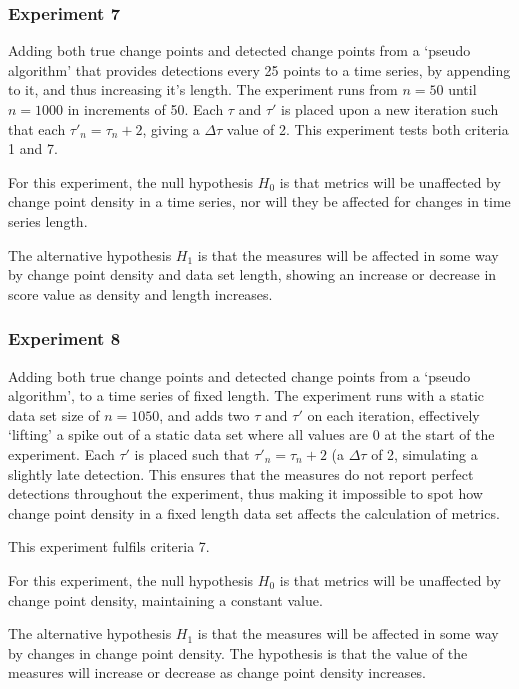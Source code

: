 \documentclass[../main.tex]{subfiles}
\begin{document}
\subsubsection{Experiment 7}

Adding both true change points and detected change points from a `pseudo algorithm' that provides detections every 25 points to a time series, by appending to it, and thus increasing it's length. The experiment runs from $n=50$ until $n=1000$ in increments of 50. Each $\tau$ and $\tau'$ is placed upon a new iteration such that each $\tau'_n = \tau_n + 2$, giving a $\Delta \tau$ value of 2. This experiment tests both criteria 1 and 7.

For this experiment, the null hypothesis $H_0$ is that metrics will be unaffected by change point density in a time series, nor will they be affected for changes in time series length.

The alternative hypothesis $H_1$ is that the measures will be affected in some way by change point density and data set length, showing an increase or decrease in score value as density and length increases.

\subsubsection{Experiment 8}

Adding both true change points and detected change points from a `pseudo algorithm', to a time series of fixed length. The experiment runs with a static data set size of $n=1050$, and adds two $\tau$ and $\tau'$ on each iteration, effectively `lifting' a spike out of a static data set where all values are 0 at the start of the experiment. Each $\tau'$ is placed such that $\tau'_n = \tau_n + 2$ (a $\Delta \tau$ of 2, simulating a slightly late detection. This ensures that the measures do not report perfect detections throughout the experiment, thus making it impossible to spot how change point density in a fixed length data set affects the calculation of metrics.

This experiment fulfils criteria 7.

For this experiment, the null hypothesis $H_0$ is that metrics will be unaffected by change point density, maintaining a constant value.

The alternative hypothesis $H_1$ is that the measures will be affected in some way by changes in change point density. The hypothesis is that the value of the measures will increase or decrease as change point density increases.
\end{document}
